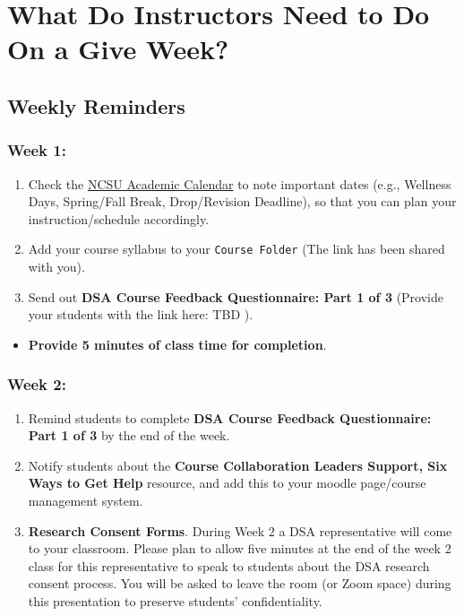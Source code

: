 \documentclass[
]{book}
\providecommand{\tightlist}{%
  \setlength{\itemsep}{0pt}\setlength{\parskip}{0pt}}
\begin{document}
\hfill\break

\hypertarget{what-do-instructors-need-to-do-on-a-give-week}{%
\chapter{What Do Instructors Need to Do On a Give Week?}\label{what-do-instructors-need-to-do-on-a-give-week}}

\hypertarget{weekly-reminders}{%
\section{Weekly Reminders}\label{weekly-reminders}}

\hypertarget{week-1}{%
\subsection{Week 1:}\label{week-1}}

\begin{enumerate}
\def\labelenumi{\arabic{enumi})}
\item
  Check the \href{https://studentservices.ncsu.edu/calendars/academic/}{NCSU Academic Calendar} to note important dates (e.g., Wellness Days, Spring/Fall Break, Drop/Revision Deadline), so that you can plan your instruction/schedule accordingly.
\item
  Add your course syllabus to your \texttt{Course\ Folder} (The link has been shared with you).
\item
  Send out { \textbf{DSA Course Feedback Questionnaire: Part 1 of 3} } (Provide your students with the link here: TBD ).
\end{enumerate}

\begin{itemize}
\tightlist
\item
  \textbf{Provide 5 minutes of class time for completion}.
\end{itemize}

\hypertarget{week-2}{%
\subsection{Week 2:}\label{week-2}}

\begin{enumerate}
\def\labelenumi{\arabic{enumi})}
\item
  Remind students to complete \textbf{DSA Course Feedback Questionnaire: Part 1 of 3} by the end of the week.
\item
  Notify students about the \textbf{Course Collaboration Leaders Support, Six Ways to Get Help} resource, and add this to your moodle page/course management system.
\item
  \textbf{Research Consent Forms}. During Week 2 a DSA representative will come to your classroom. Please plan to allow five minutes at the end of the week 2 class for this representative to speak to students about the DSA research consent process. You will be asked to leave the room (or Zoom space) during this presentation to preserve students' confidentiality.
\end{enumerate}
\end{document}
